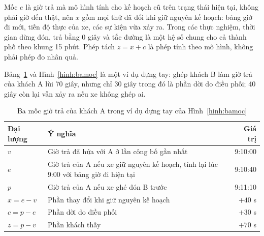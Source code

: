 Mốc $e$ là giờ trả mà mô hình tính cho kế hoạch cũ trên trạng thái hiện tại, không phải giờ đến thật, nên
$x$ gồm mọi thứ đã đổi khi giữ nguyên kế hoạch: bảng giờ đi mới, tiến độ thực của xe, các sự kiện vừa xảy
ra. Trong các thực nghiệm, thời gian dừng đón, trả bằng 0 giây và tắc đường là một hệ số chung cho cả
thành phố theo khung 15 phút. Phép tách $z = x + c$ là phép tính theo mô hình, không phải phép đo nhân
quả.

Bảng~\ref{bang:vidu-bamoc} và Hình~\ref{hinh:bamoc} là một ví dụ dựng tay: ghép khách B làm giờ trả của
khách A lùi 70 giây, nhưng chỉ 30 giây trong đó là phần dời do điều phối; 40 giây còn lại vẫn xảy ra nếu
xe không ghép ai.

\begin{table}[htbp]
\centering
\caption{Ba mốc giờ trả của khách A trong ví dụ dựng tay của Hình~\ref{hinh:bamoc}}
\label{bang:vidu-bamoc}
\small
\begin{tabular}{@{}lp{9.6cm}r@{}}
\toprule
\textbf{Đại lượng} & \textbf{Ý nghĩa} & \textbf{Giá trị}\\
\midrule
$v$ & Giờ trả đã hứa với A ở lần công bố gần nhất & 9:10:00\\
$e$ & Giờ trả của A nếu xe giữ nguyên kế hoạch, tính lại lúc 9:00 với bảng giờ đi hiện tại & 9:10:40\\
$p$ & Giờ trả của A nếu xe ghé đón B trước & 9:11:10\\
\midrule
$x = e - v$ & Phần thay đổi khi giữ nguyên kế hoạch & $+40$ s\\
$c = p - e$ & Phần dời do điều phối & $+30$ s\\
$z = p - v$ & Phần khách thấy & $+70$ s\\
\bottomrule
\end{tabular}
\end{table}

